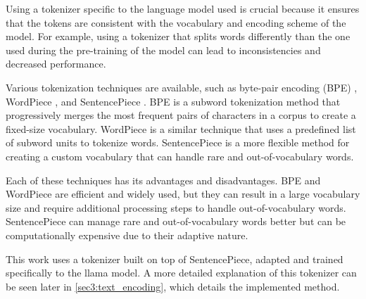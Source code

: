     Using a tokenizer specific to the language model used is crucial because it ensures that the tokens are consistent with the vocabulary and encoding scheme of the model. For example, using a tokenizer that splits words differently than the one used during the pre-training of the model can lead to inconsistencies and decreased performance.
    
    Various tokenization techniques are available, such as byte-pair encoding (BPE) \cite{gageNewAlgorithmData1994, sennrichNeuralMachineTranslation2016}, WordPiece \cite{devlinBERTPretrainingDeep2019}, and SentencePiece \cite{kudoSentencePieceSimpleLanguage2018}. BPE is a subword tokenization method that progressively merges the most frequent pairs of characters in a corpus to create a fixed-size vocabulary. WordPiece is a similar technique that uses a predefined list of subword units to tokenize words. SentencePiece is a more flexible method for creating a custom vocabulary that can handle rare and out-of-vocabulary words.
    
    Each of these techniques has its advantages and disadvantages. BPE and WordPiece are efficient and widely used, but they can result in a large vocabulary size and require additional processing steps to handle out-of-vocabulary words. SentencePiece can manage rare and out-of-vocabulary words better but can be computationally expensive due to their adaptive nature.

    This work uses a tokenizer built on top of SentencePiece, adapted and trained specifically to the \gls{llama} model. A more detailed explanation of this tokenizer can be seen later in \autoref{sec3:text_encoding}, which details the implemented method.